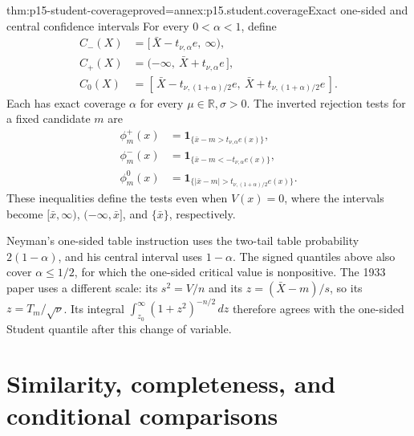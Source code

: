 \begin{hbtheorem}{thm:p15-student-coverage}{proved=annex:p15.student.coverage}{Exact one-sided and central confidence intervals}
For every \(0<\alpha<1\), define
\[
\begin{aligned}
 C_-(X)&=[\,\bar X-t_{\nu,\alpha}e,\ \infty),\\
 C_+(X)&=(-\infty,\ \bar X+t_{\nu,\alpha}e\,],\\
 C_0(X)&=[\,\bar X-t_{\nu,(1+\alpha)/2}e,\
                  \bar X+t_{\nu,(1+\alpha)/2}e\,].
\end{aligned}
\]
Each has exact coverage \(\alpha\) for every
\(\mu\in\mathbb R,\sigma>0\).
The inverted rejection tests for a fixed candidate \(m\) are
\[
\begin{aligned}
 \phi_m^+(x)&=\mathbf1_{\{\bar x-m>t_{\nu,\alpha}e(x)\}},\\
 \phi_m^-(x)&=\mathbf1_{\{\bar x-m<-t_{\nu,\alpha}e(x)\}},\\
 \phi_m^0(x)&=\mathbf1_{\{|\bar x-m|>
                             t_{\nu,(1+\alpha)/2}e(x)\}}.
\end{aligned}
\]
These inequalities define the tests even when \(V(x)=0\), where
the intervals become \([\bar x,\infty)\), \((-\infty,\bar x]\),
and \(\{\bar x\}\), respectively.
\end{hbtheorem}

Neyman's one-sided table instruction uses the two-tail table
probability \(2(1-\alpha)\), and his central interval uses
\(1-\alpha\). The signed quantiles above also cover
\(\alpha\leq1/2\), for which the one-sided critical value is
nonpositive. The 1933 paper uses a different scale:
its \(s^2=V/n\) and its \(z=(\bar X-m)/s\), so its
\(z=T_m/\sqrt\nu\). Its integral
\(\int_{z_0}^{\infty}(1+z^2)^{-n/2}\,dz\)
therefore agrees with the one-sided Student quantile after this
change of variable.

\section{Similarity, completeness, and conditional comparisons}


